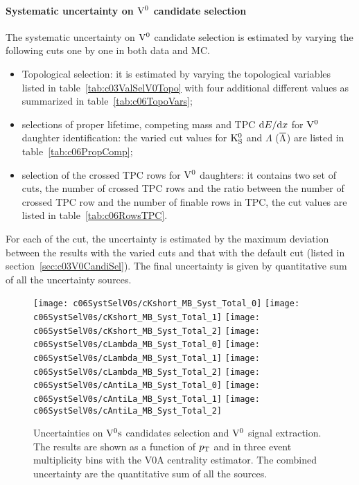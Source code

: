 \paragraph{Systematic uncertainty on ${\rm V}^{0}$ candidate selection}
The systematic uncertainty on ${\rm V}^{0}$ candidate selection is estimated
by varying the following cuts one by one in both data and MC.
\begin{itemize}
\item Topological selection:
      it is estimated by varying the topological variables listed
      in table~\ref{tab:c03ValSelV0Topo} with four additional different
      values as summarized in table~\ref{tab:c06TopoVars};
\item selections of proper lifetime, competing mass and
      TPC ${\rm d}E/{\rm d}x$ for ${\rm V}^{0}$ daughter identification:
      the varied cut values for ${\rm K}_{\rm S}^{0}$ and $\Lambda$ ($\overline{\Lambda}$) are
      listed in table~\ref{tab:c06PropComp};
\item selection of the crossed TPC rows for ${\rm V}^{0}$ daughters:
      it contains two set of cuts,
      the number of crossed TPC rows and the ratio between the number of
      crossed TPC row and the number of finable rows in TPC,
      the cut values are listed in table~\ref{tab:c06RowsTPC}.
\end{itemize}
For each of the cut,
the uncertainty is estimated by the maximum deviation between the results with
the varied cuts and that with the default cut (listed in
section~\ref{sec:c03V0CandiSel}).
The final uncertainty is given by quantitative sum of all the
uncertainty sources.

\begin{figure}[htb]
\begin{center}
\texttt{[image: c06SystSelV0s/cKshort\_MB\_Syst\_Total\_0]}
\texttt{[image: c06SystSelV0s/cKshort\_MB\_Syst\_Total\_1]}
\texttt{[image: c06SystSelV0s/cKshort\_MB\_Syst\_Total\_2]}
\texttt{[image: c06SystSelV0s/cLambda\_MB\_Syst\_Total\_0]}
\texttt{[image: c06SystSelV0s/cLambda\_MB\_Syst\_Total\_1]}
\texttt{[image: c06SystSelV0s/cLambda\_MB\_Syst\_Total\_2]}
\texttt{[image: c06SystSelV0s/cAntiLa\_MB\_Syst\_Total\_0]}
\texttt{[image: c06SystSelV0s/cAntiLa\_MB\_Syst\_Total\_1]}
\texttt{[image: c06SystSelV0s/cAntiLa\_MB\_Syst\_Total\_2]}
\caption{Uncertainties on ${\rm V}^{0}{\rm s}$ candidates selection and ${\rm V}^{0}$ signal
         extraction.
         The results are shown as a function of $p_{\rm T}$ and in three event
         multiplicity bins with the V0A centrality estimator.
         The combined uncertainty are the quantitative sum of all the sources.}
\label{fig:c06SystTotal}
\end{center}
\end{figure}

